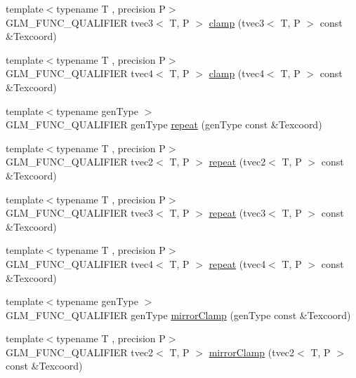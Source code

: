 \begin{DoxyCompactItemize}
\item 
{\footnotesize template$<$typename T , precision P$>$ }\\G\+L\+M\+\_\+\+F\+U\+N\+C\+\_\+\+Q\+U\+A\+L\+I\+F\+I\+E\+R tvec3$<$ T, P $>$ \hyperlink{namespaceglm_a020c0df6915c1ede86ffbd807a5b47c1}{clamp} (tvec3$<$ T, P $>$ const \&Texcoord)
\item 
{\footnotesize template$<$typename T , precision P$>$ }\\G\+L\+M\+\_\+\+F\+U\+N\+C\+\_\+\+Q\+U\+A\+L\+I\+F\+I\+E\+R tvec4$<$ T, P $>$ \hyperlink{namespaceglm_a42bda64124cb7e94d86c1edb6025a932}{clamp} (tvec4$<$ T, P $>$ const \&Texcoord)
\item 
{\footnotesize template$<$typename gen\+Type $>$ }\\G\+L\+M\+\_\+\+F\+U\+N\+C\+\_\+\+Q\+U\+A\+L\+I\+F\+I\+E\+R gen\+Type \hyperlink{group__gtx__wrap_ga809650c6310ea7c42666e918c117fb6f}{repeat} (gen\+Type const \&Texcoord)
\item 
{\footnotesize template$<$typename T , precision P$>$ }\\G\+L\+M\+\_\+\+F\+U\+N\+C\+\_\+\+Q\+U\+A\+L\+I\+F\+I\+E\+R tvec2$<$ T, P $>$ \hyperlink{namespaceglm_a3f9751f6712e70e7bee9e86edaa23dc3}{repeat} (tvec2$<$ T, P $>$ const \&Texcoord)
\item 
{\footnotesize template$<$typename T , precision P$>$ }\\G\+L\+M\+\_\+\+F\+U\+N\+C\+\_\+\+Q\+U\+A\+L\+I\+F\+I\+E\+R tvec3$<$ T, P $>$ \hyperlink{namespaceglm_a2f193fb57465ccc4888523a0c84c51f4}{repeat} (tvec3$<$ T, P $>$ const \&Texcoord)
\item 
{\footnotesize template$<$typename T , precision P$>$ }\\G\+L\+M\+\_\+\+F\+U\+N\+C\+\_\+\+Q\+U\+A\+L\+I\+F\+I\+E\+R tvec4$<$ T, P $>$ \hyperlink{namespaceglm_ade6cefbc71237ce919649e93d4a9fd05}{repeat} (tvec4$<$ T, P $>$ const \&Texcoord)
\item 
{\footnotesize template$<$typename gen\+Type $>$ }\\G\+L\+M\+\_\+\+F\+U\+N\+C\+\_\+\+Q\+U\+A\+L\+I\+F\+I\+E\+R gen\+Type \hyperlink{group__gtx__wrap_gaa6856a0a048d2749252848da35e10c8b}{mirror\+Clamp} (gen\+Type const \&Texcoord)
\item 
{\footnotesize template$<$typename T , precision P$>$ }\\G\+L\+M\+\_\+\+F\+U\+N\+C\+\_\+\+Q\+U\+A\+L\+I\+F\+I\+E\+R tvec2$<$ T, P $>$ \hyperlink{namespaceglm_adebe151810a11d00420dbc8e645dd2f4}{mirror\+Clamp} (tvec2$<$ T, P $>$ const \&Texcoord)
\item 

\end{DoxyCompactItemize}
